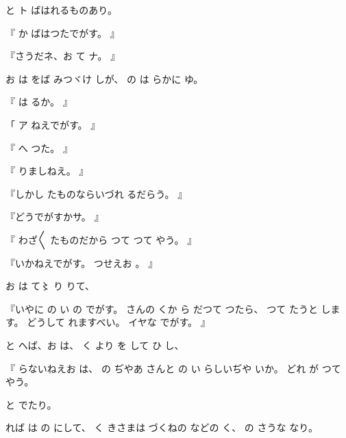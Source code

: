 と
ト
ばはれるものあり。

『
か
ばはつたでがす。
』

『さうだネ、お
て
ナ。
』

お
は
をば
みつヾけ
しが、
の
は
らかに
ゆ。

『
は
るか。
』

「
ア
ねえでがす。
』

『
へ
つた。
』

『
りましねえ。
』

『しかし
たものならいづれ
るだらう。
』

『どうでがすかサ。
』

『
わざ〳〵
たものだから
つて
つて
やう。
』

『いかねえでがす。
つせえお
。
』

お
は
て〻
り
りて、

『いやに
の
い
の
でがす。
さんの
くか
ら
だつて
つたら、
つて
たうと
します。
どうして
れますべい。
イヤな
でがす。
』

と
へば、お
は、
く
より
を
して
ひ
し、

『
らないねえお
は、
の
ぢやあ
さんと
の
い
らしいぢや
いか。
どれ
が
つて
やう。

と
でたり。

れば
は
の
にして、
く
きさまは
づくねの
などの
く、
の
さうな
なり。

